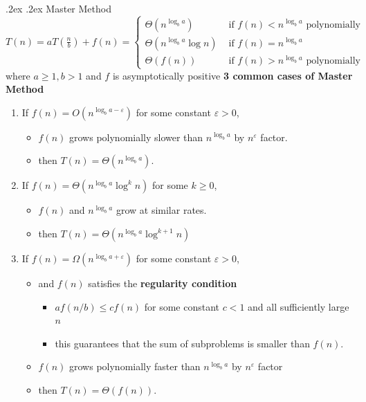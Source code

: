 \documentclass[10pt,landscape,a4paper]{article}
\makeatletter
\renewcommand{\subsubsection}{\@startsection{subsubsection}{1}{0mm}%
    {.2ex}%
    {.2ex}%
    {\rmfamily\bfseries}}
\makeatother
\begin{document}
\begin{multicols*}{4}
	\subsubsection{Master Method}
	\begin{math}
		T(n) = aT(\frac{n}{b}) + f(n) = \begin{cases}
			\Theta(n^{\log_ba}) & \text{ if } f(n) < n^{\log_ba} \text{ polynomially}
			\\ \Theta(n^{\log_ba} \log n) & \text{ if } f(n) = n^{\log_ba} 
			\\ \Theta(f(n)) & \text{ if } f(n) > n^{\log_ba} \text{ polynomially}
		\end{cases}
	\end{math} 
	where $a\geq 1, b>1$ and $f$ is asymptotically positive
	\textbf{3 common cases of Master Method}
	\begin{enumerate}
		\item If $f(n) = O(n^{\log_b a-\varepsilon})$ for some constant  $\varepsilon > 0$, 
		\begin{itemize}
			\item $f(n)$ grows polynomially slower than $n^{\log_ba}$ by $n^\varepsilon$ factor.
			\item then $T(n) = \Theta(n^{\log_ba})$.
		\end{itemize}
		\item If $f(n) = \Theta(n^{\log_ba} \log^kn) $ for some $k \geq 0$,
		\begin{itemize}
			\item $f(n)$ and $n^{\log_ba}$ grow at similar rates.
			\item then $T(n) = \Theta(n^{\log_ba}\log^{k+1} n)$
		\end{itemize}
		\item If $f(n) = \Omega(n^{\log_ba + \varepsilon})$ for some constant $\varepsilon > 0$, 
		\begin{itemize}
			\item and $f(n)$ satisfies the \textbf{regularity condition} 
			\begin{itemize}
				\item $af(n/b) \leq cf(n)$ for some constant $c<1$ and all sufficiently large $n$
				\item this guarantees that the sum of subproblems is smaller than $f(n)$.
			\end{itemize} 
			\item $f(n)$ grows polynomially faster than $n^{\log_ba}$ by $n^\varepsilon$ factor
			\item then $T(n) = \Theta(f(n))$.

\end{itemize}
\end{enumerate}
\end{multicols*}
\end{document}

